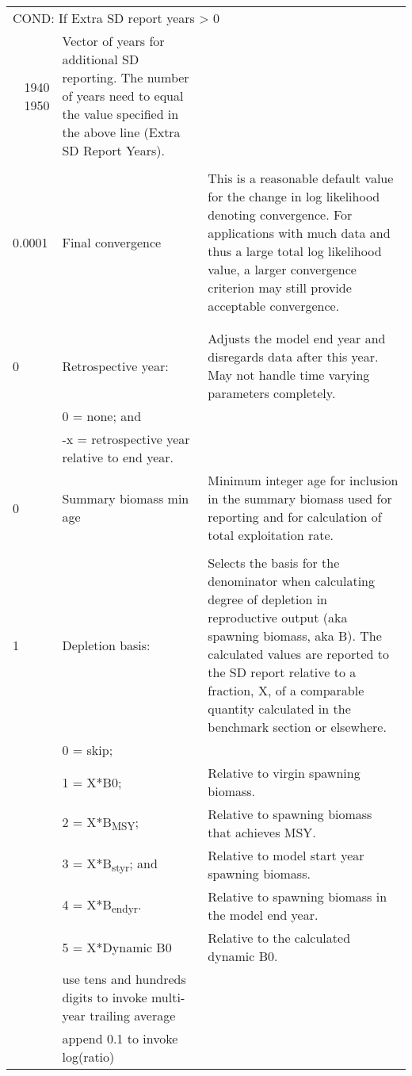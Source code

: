 {\begin{landscape}
\begin{longtable}{p{1.5cm} p{7.2cm} p{12.3cm}}
 \hline  
 \multicolumn{3}{l}{COND: If Extra SD report years > 0} \Tstrut\\

 \multicolumn{1}{r}{1940 1950} & \multirow{1}{1cm}[-0.25cm]{\parbox{19.5cm}{Vector of years for additional SD reporting. The number of years need to equal the value specified in the above line (Extra SD Report Years).}} \\
  & & \\
 
 \hline
 0.0001 & Final convergence & \multirow{1}{1cm}[-0.25cm]{\parbox{12.5cm}{This is a reasonable default value for the change in log likelihood denoting convergence. For applications with much data and thus a large total log likelihood value, a larger convergence criterion may still provide acceptable convergence.}} \Tstrut\Bstrut\\
   & & \Bstrut\\
   & & \Bstrut\\
 
 \hline
 0 & Retrospective year: & \multirow{1}{1cm}[-0.25cm]{\parbox{12.5cm}{Adjusts the model end year and disregards data after this year. May not handle time varying parameters completely.}} \Tstrut\\
   & 0 = none; and & \\
   & -x = retrospective year relative to end year. & \Bstrut\\
  
 \hline
 0 & Summary biomass min age & \multirow{1}{1cm}[-0.25cm]{\parbox{12.5cm}{Minimum integer age for inclusion in the summary biomass used for reporting and for calculation of total exploitation rate.}} \Tstrut\\
   & & \\ 

 \hline
 1 & Depletion basis: & \multirow{1}{1cm}[-0.25cm]{\parbox{12.5cm}{Selects the basis for the denominator when calculating degree of depletion in reproductive output (aka spawning biomass, aka B). The calculated values are reported to the SD report relative to a fraction, X, of a comparable quantity calculated in the benchmark section or elsewhere.}} \Tstrut\\
   & 0 = skip; & \\
   & 1 = X*B0; & Relative to virgin spawning biomass. \\
   & 2 = X*B\textsubscript{MSY}; & Relative to spawning biomass that achieves MSY. \\
   & 3 = X*B\textsubscript{styr}; and & Relative to model start year spawning biomass. \\
   & 4 = X*B\textsubscript{endyr}. & Relative to spawning biomass in the model end year. \\
   & 5 = X*Dynamic B0 & Relative to the calculated dynamic B0. \\
   & use tens and hundreds digits to invoke multi-year trailing average & \\
   & append 0.1 to invoke log(ratio) & \Bstrut\\
  

\end{longtable}
\end{landscape}}
